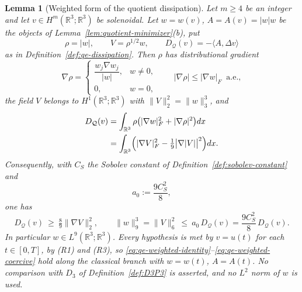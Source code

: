 \documentclass[11pt]{article}
\newtheorem{lemma}[theorem]{Lemma}
\theoremstyle{definition}
\theoremstyle{plain}
\newcommand{\R}{\mathbb R}
\newcommand{\norm}[1]{\lVert #1\rVert}
\begin{document}
\begin{lemma}[Weighted form of the quotient dissipation]
\label{lem:qe-weighted-dissipation}
Let $m\ge4$ be an integer and let $v\in H^m(\R^3;\R^3)$ be solenoidal.
Let $w=w(v)$, $A=A(v)=|w|w$ be the objects of
Lemma~\ref{lem:quotient-minimizer}(b), put
\[
 \rho=|w|,\qquad V=\rho^{1/2}w,
 \qquad
 D_{\mathcal Q}(v)=-\langle A,\Delta v\rangle
\]
as in Definition~\ref{def:qe-dissipation}.  Then $\rho$ has distributional
gradient
\begin{equation}\label{eq:qe-rhograd}
 \nabla\rho=\begin{cases}\dfrac{w_j\nabla w_j}{|w|},&w\ne0,\\[2mm]
 0,&w=0,\end{cases}
 \qquad |\nabla\rho|\le|\nabla w|_F\ \text{ a.e.},
\end{equation}
the field $V$ belongs to $H^1(\R^3;\R^3)$ with
$\norm V_2^2=\norm w_3^3$, and
\begin{align}
 D_{\mathcal Q}(v)
 &=\int_{\R^3}\rho\bigl(|\nabla w|_F^2+|\nabla\rho|^2\bigr)dx
 \label{eq:qe-weighted-identity}\\
 &=\int_{\R^3}\Bigl(|\nabla V|_F^2-\tfrac19\bigl|\nabla|V|\bigr|^2\Bigr)dx .
 \label{eq:qe-weighted-V}
\end{align}
Consequently, with $C_S$ the Sobolev constant of
Definition~\ref{def:sobolev-constant} and
\begin{equation}\label{eq:qe-a0}
 a_0:=\frac{9C_S^2}{8},
\end{equation}
one has
\begin{equation}\label{eq:qe-weighted-coercive}
 D_{\mathcal Q}(v)\ \ge\ \tfrac89\norm{\nabla V}_2^2,
 \qquad
 \norm w_9^3=\norm V_6^2\ \le\ a_0\,D_{\mathcal Q}(v)
 =\frac{9C_S^2}8\,D_{\mathcal Q}(v).
\end{equation}
In particular $w\in L^9(\R^3;\R^3)$.  Every hypothesis is met by $v=u(t)$
for each $t\in[0,T]$, by (R1) and (R3), so
\eqref{eq:qe-weighted-identity}--\eqref{eq:qe-weighted-coercive} hold along
the classical branch with $w=w(t)$, $A=A(t)$.  No comparison with $D_3$ of
Definition~\ref{def:D3P3} is asserted, and no $L^2$ norm of $w$ is used.
\end{lemma}
\end{document}
